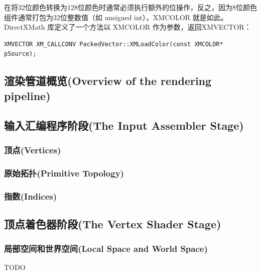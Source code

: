 \documentclass[11pt,a4paper,oldfontcommands]{memoir}
\begin{document}
{\begin{flushleft}
在将32位颜色转换为128位颜色时通常必须执行额外的位操作，反之，因为8位颜色组件通常打包为32位整数值（如 unsigned int），XMCOLOR 就是如此。DirectXMath 库定义了一个方法以 XMCOLOR 作为参数，返回XMVECTOR：
\begin{lstlisting}
XMVECTOR XM_CALLCONV PackedVector::XMLoadColor(const XMCOLOR* pSource);
\end{lstlisting}
\end{flushleft}

\subsection{渲染管道概览(Overview of the rendering pipeline)}
\subsection{输入汇编程序阶段(The Input Assembler Stage)}
\subsubsection{顶点(Vertices)}
\subsubsection{原始拓扑(Primitive Topology)}
\subsubsection{指数(Indices)}
\subsection{顶点着色器阶段(The Vertex Shader Stage)}
\subsubsection{局部空间和世界空间(Local Space and World Space)}
TODO
}
\end{document}

